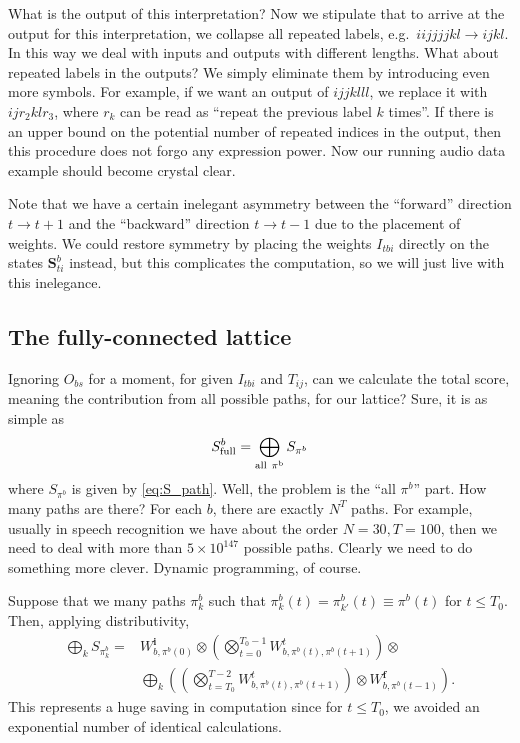 \documentclass[a4paper]{article}
\begin{document}
What is the output of this interpretation? Now we stipulate that to arrive at the output for this interpretation, we collapse all repeated labels, e.g.~$iijjjjkl\rightarrow ijkl$. In this way we deal with inputs and outputs with different lengths. What about repeated labels in the outputs? We simply eliminate them by introducing even more symbols. For example, if we want an output of $ijjklll$, we replace it with $ijr_2klr_3$, where $r_k$ can be read as ``repeat the previous label $k$ times''. If there is an upper bound on the potential number of repeated indices in the output, then this procedure does not forgo any expression power. Now our running audio data example should become crystal clear.

Note that we have a certain inelegant asymmetry between the ``forward'' direction $t\rightarrow t+1$ and the ``backward'' direction $t\rightarrow t-1$ due to the placement of weights. We could restore symmetry by placing the weights $I_{tbi}$ directly on the states $\mathbf{S}^b_{ti}$ instead, but this complicates the computation, so we will just live with this inelegance.

\subsection{The fully-connected lattice}

Ignoring $O_{bs}$ for a moment, for given $I_{tbi}$ and $T_{ij}$, can we calculate the total score, meaning the contribution from all possible paths, for our lattice? Sure, it is as simple as
\begin{equation}
S^b_{\rm{full}} = \bigoplus_{\rm{all~}\pi^b} S_{\pi^b}
\end{equation}
where $S_{\pi^b}$ is given by \eqref{eq:S_path}. Well, the problem is the ``all $\pi^b$'' part. How many paths are there? For each $b$, there are exactly $N^T$ paths. For example, usually in speech recognition we have about the order $N=30, T=100$, then we need to deal with more than $5\times 10^{147}$ possible paths. Clearly we need to do something more clever. Dynamic programming, of course.

Suppose that we many paths $\pi^b_k$ such that $\pi_k^b(t) = \pi^b_{k'}(t) \equiv \pi^b(t)$ for $t\leq T_0$. Then, applying distributivity,
\begin{align}
\bigoplus_k S_{\pi^b_k} =& W^{\mathbf{i}}_{b,\pi^b(0)} \otimes \left(\bigotimes_{t=0}^{T_0-1}W^t_{b,\pi^b(t),\pi^b(t+1)}\right)\otimes \\
 &  \bigoplus_k\left(\left(\bigotimes_{t=T_0}^{T-2}W^t_{b,\pi^b(t),\pi^b(t+1)}\right)\otimes  W^{\mathbf{f}}_{b,\pi^b(t-1)}\right).
\end{align}
This represents a huge saving in computation since for $t\leq T_0$, we avoided an exponential number of identical calculations.
\end{document}
